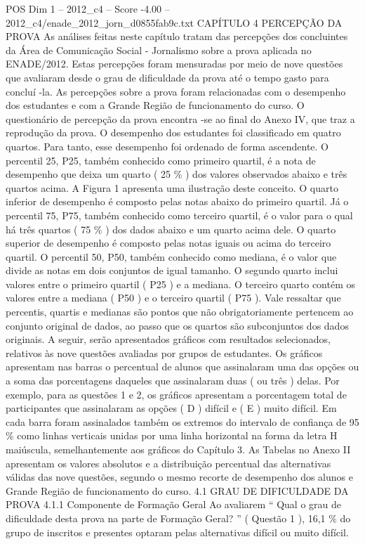\begin{textsample}{POS Dim 1 – 2012\_c4 – Score -4.00 – 2012\_c4/enade\_2012\_jorn\_d0855fab9c.txt}  \label{ex:f1_pos_364}
CAPÍTULO 4 PERCEPÇÃO DA PROVA As análises feitas neste capítulo tratam das percepções dos concluintes da Área de Comunicação Social - Jornalismo sobre a prova aplicada no ENADE/2012.
Estas percepções foram mensuradas por meio de nove questões que avaliaram desde o grau de dificuldade da prova até o tempo gasto para concluí -la.
As percepções sobre a prova foram relacionadas com o desempenho dos estudantes e com a Grande Região de funcionamento do curso.
O questionário de percepção da prova encontra -se ao final do Anexo IV, que traz a reprodução da prova.
O desempenho dos estudantes foi classificado em quatro quartos.
Para tanto, esse desempenho foi ordenado de forma ascendente.
O percentil 25, P25, também conhecido como primeiro quartil, é a nota de desempenho que deixa um quarto ( 25 \% ) dos valores observados abaixo e três quartos acima.
A Figura 1 apresenta uma ilustração deste conceito.
O quarto inferior de desempenho é composto pelas notas abaixo do primeiro quartil.
Já o percentil 75, P75, também conhecido como terceiro quartil, é o valor para o qual há três quartos ( 75 \% ) dos dados abaixo e um quarto acima dele.
O quarto superior de desempenho é composto pelas notas iguais ou acima do terceiro quartil.
O percentil 50, P50, também conhecido como mediana, é o valor que divide as notas em dois conjuntos de igual tamanho.
O segundo quarto inclui valores entre o primeiro quartil ( P25 ) e a mediana.
O terceiro quarto contém os valores entre a mediana ( P50 ) e o terceiro quartil ( P75 ).
Vale ressaltar que percentis, quartis e medianas são pontos que não obrigatoriamente pertencem ao conjunto original de dados, ao passo que os quartos são subconjuntos dos dados originais.
A seguir, serão apresentados gráficos com resultados selecionados, relativos às nove questões avaliadas por grupos de estudantes.
Os gráficos apresentam nas barras o percentual de alunos que assinalaram uma das opções ou a soma das porcentagens daqueles que assinalaram duas ( ou três ) delas.
Por exemplo, para as questões 1 e 2, os gráficos apresentam a porcentagem total de participantes que assinalaram as opções ( D ) difícil e ( E ) muito difícil.
Em cada barra foram assinalados também os extremos do intervalo de confiança de 95 \% como linhas verticais unidas por uma linha horizontal na forma da letra H maiúscula, semelhantemente aos gráficos do Capítulo 3.
As Tabelas no Anexo II apresentam os valores absolutos e a distribuição percentual das alternativas válidas das nove questões, segundo o mesmo recorte de desempenho dos alunos e Grande Região de funcionamento do curso. 4.1 GRAU DE DIFICULDADE DA PROVA 4.1.1 Componente de Formação Geral Ao avaliarem “ Qual o grau de dificuldade desta prova na parte de Formação Geral? ” ( Questão 1 ), 16,1 \% do grupo de inscritos e presentes optaram pelas alternativas difícil ou muito difícil.

\end{textsample}
